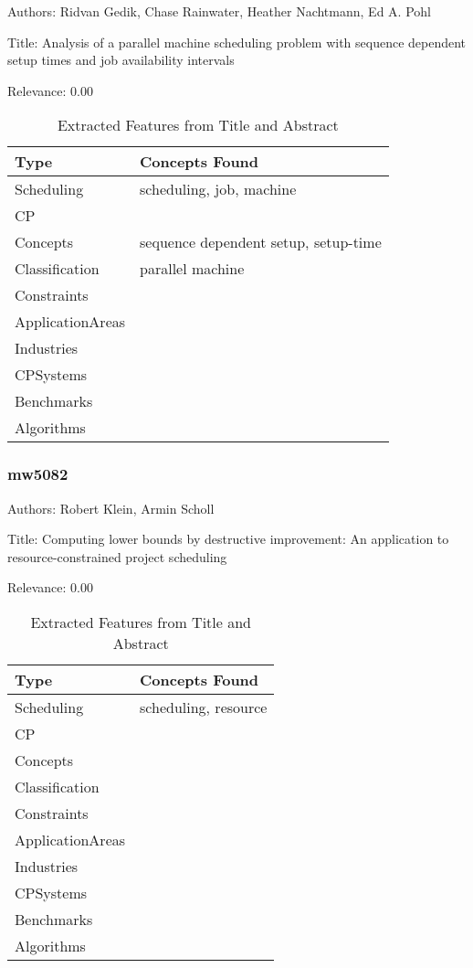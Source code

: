 Authors: Ridvan Gedik, Chase Rainwater, Heather Nachtmann, Ed A. Pohl

Title: Analysis of a parallel machine scheduling problem with sequence dependent setup times and job availability intervals

Relevance:  0.00

{\scriptsize
\begin{longtable}{p{2cm}p{20cm}}
\caption{Extracted Features from Title and Abstract}\\ \toprule
Type & Concepts Found\\ \midrule
\endhead
\bottomrule
\endfoot
Scheduling & scheduling, job, machine\\ 
CP & \\ 
Concepts & sequence dependent setup, setup-time\\ 
Classification & parallel machine\\ 
Constraints & \\ 
ApplicationAreas & \\ 
Industries & \\ 
CPSystems & \\ 
Benchmarks & \\ 
Algorithms & \\ 
\end{longtable}
}



\subsubsection{mw5082}
\label{mw:mw5082}

Authors: Robert Klein, Armin Scholl

Title: Computing lower bounds by destructive improvement: An application to resource-constrained project scheduling

Relevance:  0.00

{\scriptsize
\begin{longtable}{p{2cm}p{20cm}}
\caption{Extracted Features from Title and Abstract}\\ \toprule
Type & Concepts Found\\ \midrule
\endhead
\bottomrule
\endfoot
Scheduling & scheduling, resource\\ 
CP & \\ 
Concepts & \\ 
Classification & \\ 
Constraints & \\ 
ApplicationAreas & \\ 
Industries & \\ 
CPSystems & \\ 
Benchmarks & \\ 
Algorithms & \\ 
\end{longtable}
}



